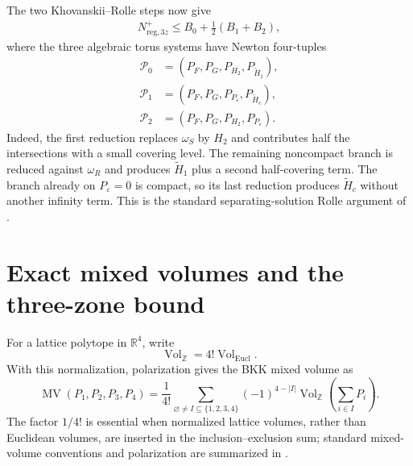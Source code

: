 \documentclass[11pt]{article}
\newcommand{\RR}{\mathbb R}
\newcommand{\MV}{\operatorname{MV}}
\begin{document}
The two Khovanskii--Rolle steps now give
\begin{align}
 N_{\mathrm{reg},3z}^{+}
 \le B_0+\frac12(B_1+B_2),\label{eq:KR-bound}
\end{align}
where the three algebraic torus systems have Newton four-tuples
\begin{align}
 \mathcal P_0&=(P_F,P_G,P_{H_2},P_{\widetilde H_1}),\label{eq:P0}\\
 \mathcal P_1&=(P_F,P_G,P_{P_\varepsilon},P_{\widetilde H_c}),\label{eq:P1}\\
 \mathcal P_2&=(P_F,P_G,P_{H_2},P_{P_\varepsilon}).\label{eq:P2}
\end{align}
Indeed, the first reduction replaces $\omega_S$ by $H_2$ and contributes half the intersections with a small covering level.  The remaining noncompact branch is reduced against $\omega_R$ and produces $\widetilde H_1$ plus a second half-covering term.  The branch already on $P_\varepsilon=0$ is compact, so its last reduction produces $\widetilde H_c$ without another infinity term.  This is the standard separating-solution Rolle argument of \cite[Chapter~3]{Khovanskii1991}.

\section{Exact mixed volumes and the three-zone bound}\label{sec:mixed-volume}

For a lattice polytope in $\RR^4$, write
\[
 \operatorname{Vol}_{\mathbb Z}=4!\operatorname{Vol}_{\mathrm{Eucl}}.
\]
With this normalization, polarization gives the BKK mixed volume as
\begin{equation}\label{eq:polarization}
 \MV(P_1,P_2,P_3,P_4)=\frac1{4!}
 \sum_{\varnothing\ne I\subseteq\{1,2,3,4\}}
 (-1)^{4-|I|}\operatorname{Vol}_{\mathbb Z}
 \left(\sum_{i\in I}P_i\right).
\end{equation}
The factor $1/4!$ is essential when normalized lattice volumes, rather than Euclidean volumes, are inserted in the inclusion--exclusion sum; standard mixed-volume conventions and polarization are summarized in \cite[Chapter~5]{Schneider2014}.
\end{document}
